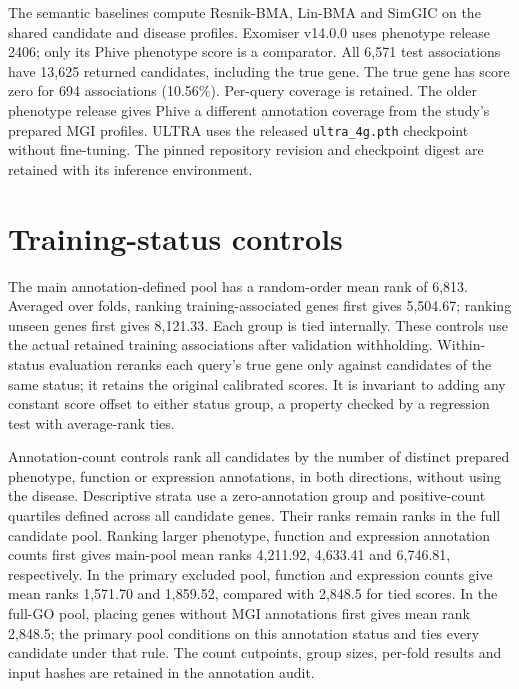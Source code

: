 \documentclass{article}
\begin{document}
The semantic baselines compute Resnik-BMA, Lin-BMA and SimGIC on the shared
candidate and disease profiles. Exomiser v14.0.0 uses phenotype release 2406;
only its Phive phenotype score is a comparator. All 6,571 test associations
have 13,625 returned candidates, including the true gene. The true gene has
score zero for 694 associations (10.56\%). Per-query coverage is retained.
The older phenotype release gives Phive a different annotation coverage
from the study's prepared MGI profiles. ULTRA uses the released
\texttt{ultra\_4g.pth} checkpoint without fine-tuning. The pinned repository
revision and checkpoint digest are retained with its inference environment.



\section{Training-status controls}

The main annotation-defined pool has a random-order mean rank of 6,813.
Averaged over folds, ranking training-associated genes first gives 5,504.67;
ranking unseen genes first gives 8,121.33. Each group is tied internally.
These controls use the actual retained training associations after validation
withholding. Within-status evaluation reranks each query's true gene only
against candidates of the same status; it retains the original calibrated
scores. It is invariant to adding any constant score offset to either status
group, a property checked by a regression test with average-rank ties.





Annotation-count controls rank all candidates by the number of distinct
prepared phenotype, function or expression annotations, in both directions,
without using the disease. Descriptive strata use a zero-annotation group
and positive-count quartiles defined across all candidate genes. Their ranks
remain ranks in the full candidate pool. Ranking larger phenotype, function
and expression annotation counts first gives main-pool mean ranks 4,211.92,
4,633.41 and 6,746.81, respectively. In the primary excluded pool, function
and expression counts give mean ranks 1,571.70 and 1,859.52, compared with
2,848.5 for tied scores. In the full-GO pool, placing genes without MGI
annotations first gives mean rank 2,848.5; the primary pool conditions on this
annotation status and ties every candidate under that rule. The count cutpoints, group sizes,
per-fold results and input hashes are retained in the annotation audit.
\end{document}
